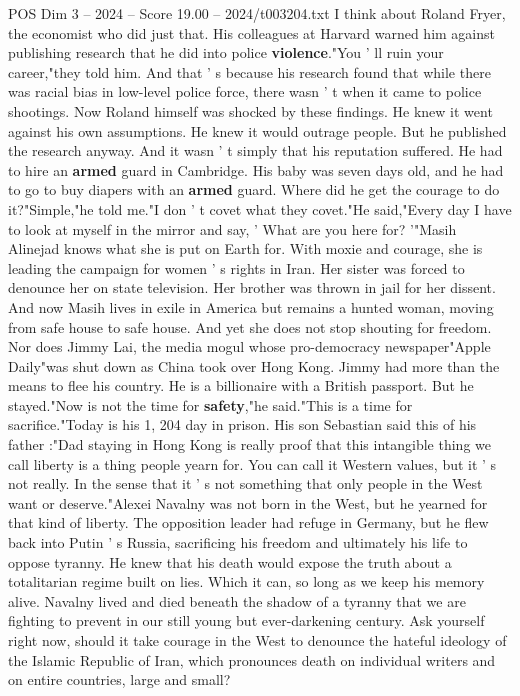 \begin{textsample}{POS Dim 3 – 2024 – Score 19.00 – 2024/t003204.txt}
I think about Roland Fryer, the economist who did just that.
His colleagues at Harvard warned him against publishing research that he did into police \textbf{violence}."You ' ll ruin your career,"they told him.
And that ' s because his research found that while there was racial bias in low-level police force, there wasn ' t when it came to police shootings.
Now Roland himself was shocked by these findings.
He knew it went against his own assumptions.
He knew it would outrage people.
But he published the research anyway.
And it wasn ' t simply that his reputation suffered.
He had to hire an \textbf{armed} guard in Cambridge.
His baby was seven days old, and he had to go to buy diapers with an \textbf{armed} guard.
Where did he get the courage to do it?"Simple,"he told me."I don ' t covet what they covet."He said,"Every day I have to look at myself in the mirror and say, ' What are you here for? '"Masih Alinejad knows what she is put on Earth for.
With moxie and courage, she is leading the campaign for women ' s rights in Iran.
Her sister was forced to denounce her on state television.
Her brother was thrown in jail for her dissent.
And now Masih lives in exile in America but remains a hunted woman, moving from safe house to safe house.
And yet she does not stop shouting for freedom.
Nor does Jimmy Lai, the media mogul whose pro-democracy newspaper"Apple Daily"was shut down as China took over Hong Kong.
Jimmy had more than the means to flee his country.
He is a billionaire with a British passport.
But he stayed."Now is not the time for \textbf{safety},"he said."This is a time for sacrifice."Today is his 1, 204 day in prison.
His son Sebastian said this of his father :"Dad staying in Hong Kong is really proof that this intangible thing we call liberty is a thing people yearn for.
You can call it Western values, but it ' s not really.
In the sense that it ' s not something that only people in the West want or deserve."Alexei Navalny was not born in the West, but he yearned for that kind of liberty.
The opposition leader had refuge in Germany, but he flew back into Putin ' s Russia, sacrificing his freedom and ultimately his life to oppose tyranny.
He knew that his death would expose the truth about a totalitarian regime built on lies.
Which it can, so long as we keep his memory alive.
Navalny lived and died beneath the shadow of a tyranny that we are fighting to prevent in our still young but ever-darkening century.
Ask yourself right now, should it take courage in the West to denounce the hateful ideology of the Islamic Republic of Iran, which pronounces death on individual writers and on entire countries, large and small?

\end{textsample}
